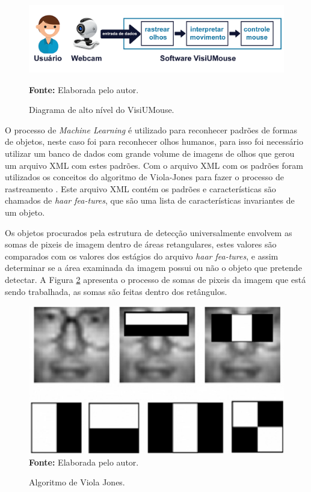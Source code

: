 \begin{figure}[htbp]
\centering
\caption{Diagrama de alto nível do VisiUMouse.}
\includegraphics[scale=.25]{img/projeto-diagrama-alto-nivel.png}

  \textbf{Fonte:} Elaborada pelo autor.
\label{fig:projeto-diagrama-alto-nivel}
\end{figure}

O processo de \textit{Machine Learning} é utilizado para reconhecer padrões de formas de objetos, neste caso foi para reconhecer olhos humanos, para isso foi necessário utilizar um banco de dados com grande volume de imagens de olhos que gerou um arquivo XML com estes padrões. Com o arquivo XML com os padrões foram utilizados os conceitos do algoritmo de Viola-Jones para fazer o processo de rastreamento \cite{viola2001rapid}. Este arquivo XML contém os padrões e características são chamados de \textit{haar fea-tures}, que são uma lista de características invariantes de um objeto.
% 
% 

Os objetos procurados pela estrutura de detecção universalmente envolvem as somas de pixeis de imagem dentro de áreas retangulares, estes valores são comparados com os valores dos estágios do arquivo \textit{haar fea-tures}, e assim determinar se a área examinada da imagem possui ou não o objeto que pretende detectar. A Figura \ref{fig:viola-jones-ret} apresenta o processo de somas de pixeis da imagem que está sendo trabalhada, as somas são feitas dentro dos retângulos. 

\begin{figure}[htbp]
\caption{Algoritmo de Viola Jones.} 
\centering \includegraphics[scale=1]{img/viola-jones-ret.png}
\textbf{Fonte:} Elaborada pelo autor.
\label{fig:viola-jones-ret}
\end{figure}

